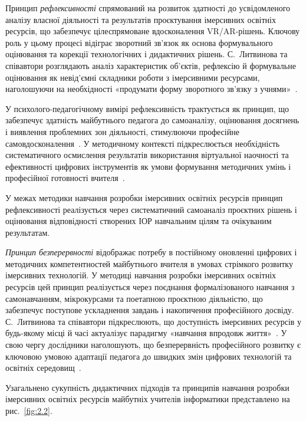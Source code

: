 Принцип \emph{рефлексивності} спрямований на розвиток здатності до усвідомленого аналізу власної діяльності та результатів проєктування імерсивних освітніх ресурсів, що забезпечує цілеспрямоване вдосконалення VR/AR-рішень. Ключову роль у цьому процесі відіграє зворотний зв'язок як основа формувального оцінювання та корекції технологічних і дидактичних рішень. С.~Литвинова та співавтори розглядають аналіз характеристик об'єктів, рефлексію й формувальне оцінювання як невід'ємні складники роботи з імерсивними ресурсами, наголошуючи на необхідності «продумати форму зворотного зв'язку з учнями»~\cite[c.~28; 37]{Lytvynova2023Monograph}.

У психолого-педагогічному вимірі рефлексивність трактується як принцип, що забезпечує здатність майбутнього педагога до самоаналізу, оцінювання досягнень і виявлення проблемних зон діяльності, стимулюючи професійне самовдосконалення~\cite{ReflexiveApproach2018}. У методичному контексті підкреслюється необхідність систематичного осмислення результатів використання віртуальної наочності та ефективності цифрових інструментів як умови формування методичних умінь і професійної готовності вчителя~\cite{Lytvynova2023Monograph}.

У межах методики навчання розробки імерсивних освітніх ресурсів принцип рефлексивності реалізується через систематичний самоаналіз проєктних рішень і оцінювання відповідності створених ІОР навчальним цілям та очікуваним результатам.

\emph{Принцип безперервності} відображає потребу в постійному оновленні цифрових і методичних компетентностей майбутнього вчителя в умовах стрімкого розвитку імерсивних технологій. У методиці навчання розробки імерсивних освітніх ресурсів цей принцип реалізується через поєднання формалізованого навчання з самонавчанням, мікрокурсами та поетапною проєктною діяльністю, що забезпечує поступове ускладнення завдань і накопичення професійного досвіду. С.~Литвинова та співавтори підкреслюють, що доступність імерсивних ресурсів у будь-якому місці й часі актуалізує парадигму «навчання впродовж життя»~\cite[c.~4; 21]{Lytvynova2023Monograph}. У свою чергу дослідники наголошують, що безперервність професійного розвитку є ключовою умовою адаптації педагога до швидких змін цифрових технологій та освітніх середовищ~\cite{Sysoieva2015Pedagogy}.

Узагальнено сукупність дидактичних підходів та принципів навчання розробки імерсивних освітніх ресурсів майбутніх учителів інформатики представлено на рис.~\ref{fig:2.2}.

